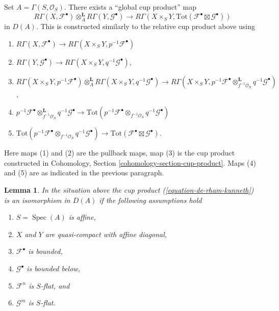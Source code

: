 \documentclass{stacks-project}
\theoremstyle{plain}
\newtheorem{lemma}[subsection]{Lemma}
\theoremstyle{definition}
\theoremstyle{remark}
\numberwithin{equation}{subsection}
\def\Spec{\mathop{\mathrm{Spec}}}
\begin{document}
\medskip\noindent
Set $A = \Gamma(S, \mathcal{O}_S)$. There exists a ``global cup product'' map
\begin{equation}
\label{equation-de-rham-kunneth}
R\Gamma(X, \mathcal{F}^\bullet)
\otimes_A^\mathbf{L}
R\Gamma(Y, \mathcal{G}^\bullet)
\longrightarrow
R\Gamma(X \times_S Y,
\text{Tot}(\mathcal{F}^\bullet \boxtimes \mathcal{G}^\bullet))
\end{equation}
in $D(A)$. This is constructed similarly to the relative cup product above
using
\begin{enumerate}
\item $R\Gamma(X, \mathcal{F}^\bullet) \to
R\Gamma(X \times_S Y, p^{-1}\mathcal{F}^\bullet)$
\item $R\Gamma(Y, \mathcal{G}^\bullet) \to
R\Gamma(X \times_S Y, q^{-1}\mathcal{G}^\bullet)$,
\item $R\Gamma(X \times_S Y, p^{-1}\mathcal{F}^\bullet)
\otimes_A^\mathbf{L} R\Gamma(X \times_S Y, q^{-1}\mathcal{G}^\bullet) \to
R\Gamma(X \times_S Y,
p^{-1}\mathcal{F}^\bullet \otimes_{f^{-1}\mathcal{O}_S}^\mathbf{L}
q^{-1}\mathcal{G}^\bullet)$,
\item
$p^{-1}\mathcal{F}^\bullet \otimes_{f^{-1}\mathcal{O}_S}^\mathbf{L}
q^{-1}\mathcal{G}^\bullet \to
\text{Tot}(p^{-1}\mathcal{F}^\bullet \otimes_{f^{-1}\mathcal{O}_S}
q^{-1}\mathcal{G}^\bullet)$
\item
$\text{Tot}(p^{-1}\mathcal{F}^\bullet \otimes_{f^{-1}\mathcal{O}_S}
q^{-1}\mathcal{G}^\bullet) \to \text{Tot}(\mathcal{F}^\bullet \boxtimes
\mathcal{G}^\bullet)$.
\end{enumerate}
Here maps (1) and (2) are the pullback maps, map (3) is the cup product
constructed in Cohomology, Section \ref{cohomology-section-cup-product}.
Maps (4) and (5) are as indicated in the previous paragraph.

\begin{lemma}
\label{lemma-kunneth-special}
In the situation above the cup product (\ref{equation-de-rham-kunneth})
is an isomorphism in $D(A)$ if the following assumptions hold
\begin{enumerate}
\item $S = \Spec(A)$ is affine,
\item $X$ and $Y$ are quasi-compact with affine diagonal,
\item $\mathcal{F}^\bullet$ is bounded,
\item $\mathcal{G}^\bullet$ is bounded below,
\item $\mathcal{F}^n$ is $S$-flat, and
\item $\mathcal{G}^m$ is $S$-flat.
\end{enumerate}
\end{lemma}
\end{document}
